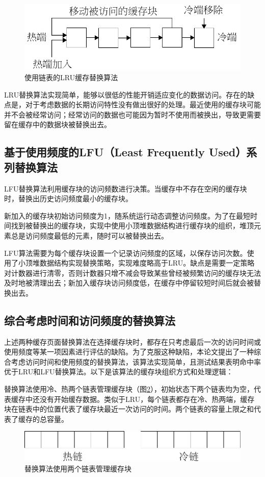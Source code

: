 \begin{figure}[H]
\centering
\includegraphics[width=0.6\linewidth]{./graph/replace-algo-lru}
\caption{使用链表的LRU缓存替换算法}
\label{fig:replace-algo-lru}
\end{figure}

LRU替换算法实现简单，能够以很低的性能开销适应变化的数据访问。存在的缺点是，对于考虑数据的长期访问特性没有做出很好的处理。最近使用的缓存块可能并不会被经常访问；经常访问的数据也可能因为暂时不使用而被换出，导致更需要留在缓存中的数据块被替换出去。

\subsection{基于使用频度的LFU（Least Frequently Used）系列替换算法}

LFU替换算法\cite{LFU}利用缓存块的访问频数进行决策。当缓存中不存在空闲的缓存块时，替换出历史访问频度最小的缓存块。

新加入的缓存块初始访问频度为1，随系统运行动态调整访问频度。为了在最短时间找到被替换出的缓存块，实现中使用小顶堆数据结构进行缓存块的组织，堆顶元素总是访问频度最低的元素，随时可以被替换出去。

LFU算法需要为每个缓存块设置一个记录访问频度的区域，以保存访问次数。使用了小顶堆数据结构实现替换策略，实现难度略高于LRU。缺点是需要一定策略对计数器进行清零，否则计数器只增不减会导致某些曾经被频繁访问的缓存块无法及时地被清理出去；新加入缓存块访问频度低，在缓存中停留较短时间后就会被替换出去。

\subsection{综合考虑时间和访问频度的替换算法}

上述两种缓存页面替换算法在选择缓存块时，都存在只考虑最后一次的访问时间或使用频度等某一项因素进行评估的缺陷。为了克服这种缺陷，本论文提出了一种综合考虑访问时间和使用频度的替换算法，该算法实现简单，且测试结果表明命中率优于LRU和LFU替换算法。以下是该算法的缓存块组织方式和处理逻辑：

替换算法使用冷、热两个链表管理缓存块（图\ref{fig:replace-algo-1}），初始状态下两个链表均为空，代表缓存中还没有开始缓存数据。类似于LRU，每个链表都存在冷、热两端，缓存块在链表中的位置代表了缓存块最近一次访问的时间。两个链表的容量上限之和代表了缓存的总容量。
\begin{figure}[H]
\centering
\includegraphics[width=0.6\linewidth]{./graph/replace-algo-1}
\caption{替换算法使用两个链表管理缓存块}
\label{fig:replace-algo-1}
\end{figure}

